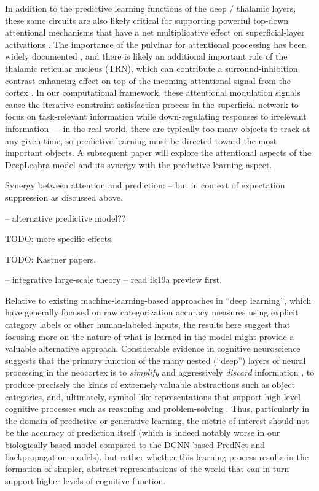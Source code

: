 \documentclass[11pt,twoside]{article}
\newif\myifpdf
\begin{document}
In addition to the predictive learning functions of the deep / thalamic layers, these same circuits are also likely critical for supporting powerful top-down attentional mechanisms that have a net multiplicative effect on superficial-layer activations \cite{BortoneOlsenScanziani14,OlsenBortoneAdesnikEtAl12,BortoneOlsenScanziani14,OlsenBortoneAdesnikEtAl12}. The importance of the pulvinar for attentional processing has been widely documented \cite[e.g.,]{LaBergeBuchsbaum90,BenderYouakim01,SaalmannPinskWangEtAl12}, and there is likely an additional important role of the thalamic reticular nucleus (TRN), which can contribute a surround-inhibition contrast-enhancing effect on top of the incoming attentional signal from the cortex \cite{Crick84,Pinault04,WimmerSchmittDavidsonEtAl15}.  In our computational framework, these attentional modulation signals cause the iterative constraint satisfaction process in the superficial network to focus on task-relevant information while down-regulating responses to irrelevant information --- in the real world, there are typically too many objects to track at any given time, so predictive learning must be directed toward the most important objects. A subsequent paper will explore the attentional aspects of the DeepLeabra model and its synergy with the predictive learning aspect.

Synergy between attention and prediction: \cite{RichterdeLange19} -- but in context of expectation suppression as discussed above.

\cite{KellerMrsic-Flogel18} -- alternative predictive model??

TODO: more specific effects.

TODO: Kastner papers.  \cite{HalassaKastner17}   \cite{FiebelkornPinskKastner18}  \cite{FiebelkornKastner19}

\cite{JaramilloMejiasWang19} -- integrative large-scale theory -- read fk19a preview first.

 Relative to existing machine-learning-based approaches in ``deep learning'', which have generally focused on raw categorization accuracy measures using explicit category labels or other human-labeled inputs, the results here suggest that focusing more on the nature of what is learned in the model might provide a valuable alternative approach.  Considerable evidence in cognitive neuroscience suggests that the primary function of the many nested (``deep'') layers of neural processing in the neocortex is to \emph{simplify} and aggressively \emph{discard} information \cite{SimonsRensink05}, to produce precisely the kinds of extremely valuable abstractions such as object categories, and, ultimately, symbol-like representations that support high-level cognitive processes such as reasoning and problem-solving \cite{RougierNoelleBraverEtAl05,OReillyPetrovCohenEtAl14}.  Thus, particularly in the domain of predictive or generative learning, the metric of interest should not be the accuracy of prediction itself (which is indeed notably worse in our biologically based model compared to the DCNN-based PredNet and backpropagation models), but rather whether this learning process results in the formation of simpler, abstract representations of the world that can in turn support higher levels of cognitive function.
\end{document}
